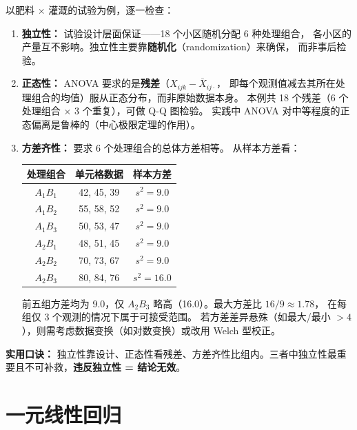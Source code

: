 \begin{remark}
以肥料 $\times$ 灌溉的试验为例，逐一检查：

\begin{enumerate}
    \item \textbf{独立性：} 试验设计层面保证——18 个小区随机分配 6 种处理组合，
    各小区的产量互不影响。独立性主要靠\textbf{随机化}（randomization）来确保，
    而非事后检验。

    \item \textbf{正态性：} ANOVA 要求的是\textbf{残差}（$X_{ijk} - \bar{X}_{ij\cdot}$，
    即每个观测值减去其所在处理组合的均值）服从正态分布，而非原始数据本身。
    本例共 18 个残差（6 个处理组合 $\times$ 3 个重复），可做 Q-Q 图检验。
    实践中 ANOVA 对中等程度的正态偏离是鲁棒的（中心极限定理的作用）。

    \item \textbf{方差齐性：} 要求 6 个处理组合的总体方差相等。
    从样本方差看：
    \begin{center}
    \begin{tabular}{c|c|c}
        \toprule
        处理组合 & 单元格数据 & 样本方差 \\
        \midrule
        $A_1B_1$ & 42, 45, 39 & $s^2 = 9.0$ \\
        $A_1B_2$ & 55, 58, 52 & $s^2 = 9.0$ \\
        $A_1B_3$ & 50, 53, 47 & $s^2 = 9.0$ \\
        $A_2B_1$ & 48, 51, 45 & $s^2 = 9.0$ \\
        $A_2B_2$ & 70, 73, 67 & $s^2 = 9.0$ \\
        $A_2B_3$ & 80, 84, 76 & $s^2 = 16.0$ \\
        \bottomrule
    \end{tabular}
    \end{center}
    前五组方差均为 9.0，仅 $A_2B_3$ 略高（16.0）。最大方差比 $16/9 \approx 1.78$，
    在每组仅 3 个观测的情况下属于可接受范围。
    若方差差异悬殊（如最大/最小 $> 4$），则需考虑数据变换（如对数变换）或改用 Welch 型校正。
\end{enumerate}

\textbf{实用口诀：} 独立性靠设计、正态性看残差、方差齐性比组内。三者中独立性最重要且不可补救，\textbf{违反独立性 = 结论无效}。
\end{remark}

\section{一元线性回归}

